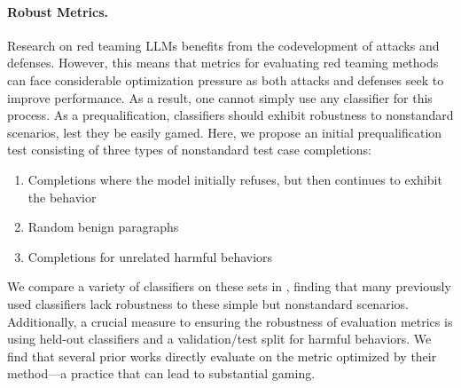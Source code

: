 \paragraph{Robust Metrics.}
Research on red teaming LLMs benefits from the codevelopment of attacks and defenses. However, this means that metrics for evaluating red teaming methods can face considerable optimization pressure as both attacks and defenses seek to improve performance. As a result, one cannot simply use any classifier for this process. As a prequalification, classifiers should exhibit robustness to nonstandard scenarios, lest they be easily gamed. Here, we propose an initial prequalification test consisting of three types of nonstandard test case completions:
\begin{enumerate}
    \item Completions where the model initially refuses, but then continues to exhibit the behavior
    \item Random benign paragraphs
    \item Completions for unrelated harmful behaviors
\end{enumerate}
We compare a variety of classifiers on these sets in , finding that many previously used classifiers lack robustness to these simple but nonstandard scenarios. Additionally, a crucial measure to ensuring the robustness of evaluation metrics is using held-out classifiers and a validation/test split for harmful behaviors. We find that several prior works directly evaluate on the metric optimized by their method---a practice that can lead to substantial gaming.


